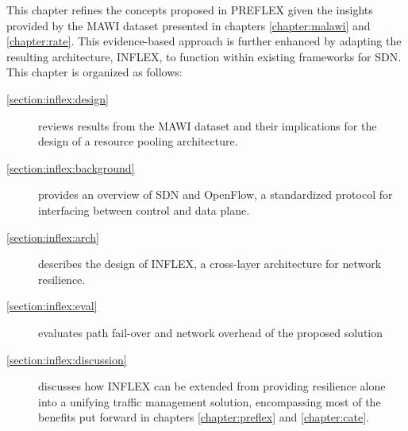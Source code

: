 This chapter refines the concepts proposed in \ac{PREFLEX} given the insights provided by the \ac{MAWI} dataset presented in chapters \ref{chapter:malawi} and \ref{chapter:rate}.
This evidence-based approach is further enhanced by adapting the resulting architecture, INFLEX, to function within existing frameworks for \ac{SDN}.
This chapter is organized as follows:

\renewcommand{\descriptionlabel}[1]{\hspace{\labelsep}\textbf{Section #1}}
\begin{description}
\item[\ref{section:inflex:design}] reviews results from the \ac{MAWI} dataset and their implications for the design of a resource pooling architecture.
\item[\ref{section:inflex:background}] provides an overview of \ac{SDN} and OpenFlow, a standardized protocol for interfacing between control and data plane.
\item[\ref{section:inflex:arch}] describes the design of INFLEX, a cross-layer architecture for network resilience.
\item[\ref{section:inflex:eval}] evaluates path fail-over and network overhead of the proposed solution
\item[\ref{section:inflex:discussion}] discusses how INFLEX can be extended from providing resilience alone into a unifying traffic management solution, encompassing most of the benefits put forward in chapters \ref{chapter:preflex} and \ref{chapter:cate}.
\end{description}


%

